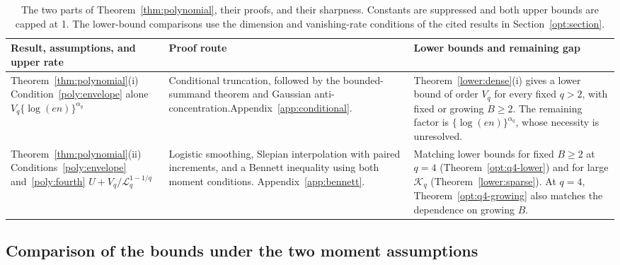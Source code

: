 \documentclass[11pt,letterpaper]{article}
\theoremstyle{remark}
\begin{document}
\begin{table}[htbp]
\centering

\small
\renewcommand{\arraystretch}{1.15}
\begin{tabularx}{\textwidth}{@{}>{\raggedright\arraybackslash}p{}
 >{\raggedright\arraybackslash}p{}
 >{\raggedright\arraybackslash}X@{}}
\toprule
Result, assumptions, and upper rate & Proof route & Lower bounds and remaining gap\\
\midrule
Theorem~\ref{thm:polynomial}\textup{(i)}\newline
Condition~\eqref{poly:envelope} alone\newline
\(V_q\{\log(en)\}^{\alpha_q}\)
& Conditional truncation, followed by the bounded-summand theorem and
Gaussian anti-concentration.\newline Appendix~\ref{app:conditional}.
& Theorem~\ref{lower:dense}\textup{(i)} gives a lower bound of order
\(V_q\) for every fixed \(q>2\), with fixed or growing \(B\ge2\).
The remaining factor is \(\{\log(en)\}^{\alpha_q}\), whose
necessity is unresolved.\\[0.6em]
Theorem~\ref{thm:polynomial}\textup{(ii)}\newline
Conditions~\eqref{poly:envelope} and~\eqref{poly:fourth}\newline
\(U+V_q/\mathcal L_q^{1-1/q}\)
& Logistic smoothing, Slepian interpolation with paired increments, and
a Bennett inequality using both moment conditions.\newline
Appendix~\ref{app:bennett}.
& Matching lower bounds for fixed \(B\ge2\) at \(q=4\)
(Theorem~\ref{opt:q4-lower}) and for large \(\mathcal K_q\)
(Theorem~\ref{lower:sparse}). At \(q=4\),
Theorem~\ref{opt:q4-growing} also matches the dependence on growing \(B\).\\
\bottomrule
\end{tabularx}
\caption{The two parts of Theorem~\ref{thm:polynomial}, their proofs,
and their sharpness. Constants are suppressed and both upper bounds
are capped at 1. The lower-bound comparisons use the dimension and
vanishing-rate conditions of the cited results in Section~\ref{opt:section}.}
\label{poly:summary}
\end{table}

\subsection{\texorpdfstring{{Comparison of the bounds under the two moment assumptions}}{Comparison of the bounds under the two moment assumptions}}\label{poly:transition}
\end{document}
